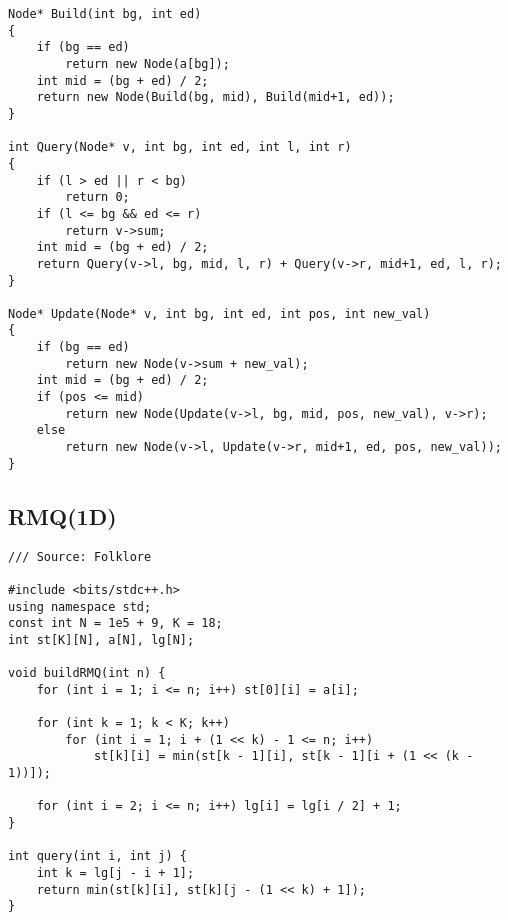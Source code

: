 \documentclass[FSZ,a4paper,onesided]{article}
\begin{document}
\begin{multicols*}{\COLS}
\begin{lstlisting}
Node* Build(int bg, int ed) 
{
    if (bg == ed)
        return new Node(a[bg]);
    int mid = (bg + ed) / 2;
    return new Node(Build(bg, mid), Build(mid+1, ed));
}
 
int Query(Node* v, int bg, int ed, int l, int r) 
{
    if (l > ed || r < bg)
        return 0;
    if (l <= bg && ed <= r)
        return v->sum;
    int mid = (bg + ed) / 2;
    return Query(v->l, bg, mid, l, r) + Query(v->r, mid+1, ed, l, r);
}
 
Node* Update(Node* v, int bg, int ed, int pos, int new_val) 
{
    if (bg == ed)
        return new Node(v->sum + new_val);
    int mid = (bg + ed) / 2;
    if (pos <= mid)
        return new Node(Update(v->l, bg, mid, pos, new_val), v->r);
    else
        return new Node(v->l, Update(v->r, mid+1, ed, pos, new_val));
}\end{lstlisting}
\subsection{RMQ(1D)}
\begin{lstlisting}
/// Source: Folklore

#include <bits/stdc++.h>
using namespace std;
const int N = 1e5 + 9, K = 18;
int st[K][N], a[N], lg[N];

void buildRMQ(int n) {
    for (int i = 1; i <= n; i++) st[0][i] = a[i];

    for (int k = 1; k < K; k++)
        for (int i = 1; i + (1 << k) - 1 <= n; i++)
            st[k][i] = min(st[k - 1][i], st[k - 1][i + (1 << (k - 1))]);

    for (int i = 2; i <= n; i++) lg[i] = lg[i / 2] + 1;
}

int query(int i, int j) {
    int k = lg[j - i + 1];
    return min(st[k][i], st[k][j - (1 << k) + 1]);
}
\end{lstlisting}

\end{multicols*}
\end{document}
